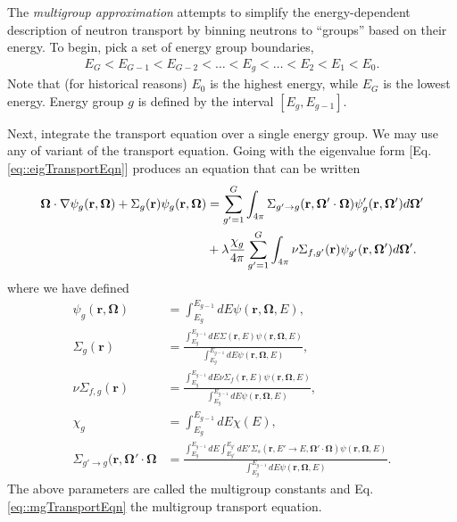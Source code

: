 \documentclass[11pt]{article}
\renewcommand\vec{\mathbf}
\begin{document}
The \emph{multigroup approximation} attempts to simplify the energy-dependent description of neutron transport by binning neutrons to ``groups'' based on their energy.  To begin, pick a set of energy group boundaries, 
\begin{align}
  E_G < E_{G-1} < E_{G-2} < \hdots < E_g < \hdots < E_2 < E_1 < E_0.
\end{align}
Note that (for historical reasons) \(E_0\) is the highest energy, while \(E_G\) is the lowest energy.  Energy group \(g\) is defined by the interval \([E_g, E_{g-1}]\).  

Next, integrate the transport equation over a single energy group.  We may use any of variant of the transport equation.  Going with the eigenvalue form [Eq. \eqref{eq::eigTransportEqn}] produces an equation that can be written
\begin{align}
  \vec{\Omega} \cdot \nabla \psi_g(\vec{r},\vec{\Omega})
  + \Sigma_g(\vec{r}) \psi_g(\vec{r},\vec{\Omega})
  &= \sum_{g'=1}^G \int_{4\pi} \Sigma_{g'\rightarrow g}(\vec{r}, \vec{\Omega}'\cdot\vec{\Omega}) \psi_g'(\vec{r},\vec{\Omega}') d\vec{\Omega}' \notag\\
  &+ \lambda\frac{\chi_g}{4\pi} \sum_{g'=1}^G \int_{4\pi} \nu\Sigma_{f,g'}(\vec{r}) \psi_{g'}(\vec{r},\vec{\Omega}') d\vec{\Omega}'.
  \label{eq::mgTransportEqn}
\end{align}
where we have defined
\begin{align}
  \psi_g(\vec{r},\vec{\Omega}) &= \int_{E_g}^{E_{g-1}} dE \psi(\vec{r},\vec{\Omega},E), \\
  \Sigma_g(\vec{r}) &= \frac{\int_{E_g}^{E_{g-1}} dE \Sigma(\vec{r},E) \psi(\vec{r},\vec{\Omega},E)}{\int_{E_g}^{E_{g-1}} dE \psi(\vec{r},\vec{\Omega},E)}, \\
  \nu\Sigma_{f,g}(\vec{r}) &= \frac{\int_{E_g}^{E_{g-1}} dE \nu\Sigma_f(\vec{r},E) \psi(\vec{r},\vec{\Omega},E)}{\int_{E_g}^{E_{g-1}} dE \psi(\vec{r},\vec{\Omega},E)}, \\
  \chi_g &=  \int_{E_g}^{E_{g-1}} dE \chi(E), \\
  \Sigma_{g'\rightarrow g}(\vec{r}, \vec{\Omega}'\cdot\vec{\Omega} &= 
    \frac{\int_{E_g}^{E_{g-1}} dE \int_{E_{g'}}^{E_{g'}} dE' \Sigma_s(\vec{r},E' \rightarrow E, \vec{\Omega}'\cdot\vec{\Omega}) \psi(\vec{r},\vec{\Omega},E)}{\int_{E_g}^{E_{g-1}} dE \psi(\vec{r},\vec{\Omega},E)}.
\end{align}
The above parameters are called the multigroup constants and Eq. \eqref{eq::mgTransportEqn} the multigroup transport equation.  
\end{document}
